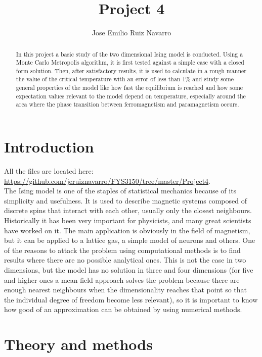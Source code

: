 \documentclass[11pt,a4paper,oneside]{article}
\begin{document}
	\title{\textbf{\textbf{\Huge Project 4}}}
	\author{Jose Emilio Ruiz Navarro}
	\maketitle
	\begin{abstract}In this project a basic study of the two dimensional Ising model is conducted. Using a Monte Carlo Metropolis algorithm, it is first tested against a simple case with a closed form solution. Then, after satisfactory results, it is used to calculate in a rough manner the value of the critical temperature with an error of less than $1\%$ and study some general properties of the model like how fast the equilibrium is reached and how some expectation values relevant to the model depend on temperature, especially around the area where the phase transition between ferromagnetism and paramagnetism occurs.\end{abstract}
	\newpage
	
	\section{Introduction}
	
		All the files are located here: \url{https://github.com/jeruiznavarro/FYS3150/tree/master/Project4}.\\
	
		The Ising model is one of the staples of statistical mechanics because of its simplicity and usefulness. It is used to describe magnetic systems composed of discrete spins that interact with each other, usually only the closest neighbours. Historically it has been very important for physicists, and many great scientists have worked on it. The main application is obviously in the field of magnetism, but it can be applied to a lattice gas, a simple model of neurons and others. One of the reasons to attack the problem using computational methods is to find results where there are no possible analytical ones. This is not the case in two dimensions, but the model has no solution in three and four dimensions (for five and higher ones a mean field approach solves the problem because there are enough nearest neighbours when the dimensionality reaches that point so that the individual degree of freedom become less relevant), so it is important to know how good of an approximation can be obtained by using numerical methods.\\
	
	\section{Theory and methods}
	
\end{document}

